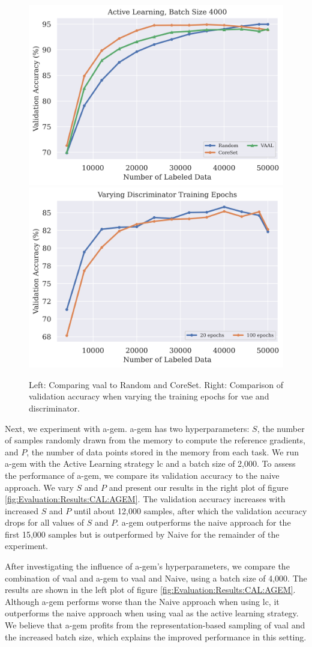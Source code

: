 \begin{figure}[h]
    \centering
    \includegraphics[width=0.46\linewidth]{images/results_CAL/vaal_al.png} \hfill
    \includegraphics[width=0.46\linewidth]{images/results_CAL/vaal_disc_epochs.png}
    \caption[Continual Active Learning Custom Replay strategy]{Left: Comparing \gls{vaal} to Random and CoreSet.
    Right: Comparison of validation accuracy when varying the training epochs for \gls{vae} and discriminator.}
    \label{fig:Evaluation:CAL:VAAL}
\end{figure}

Next, we experiment with \gls{a-gem}. \gls{a-gem} has two hyperparameters: $S$,  the number of samples randomly drawn from the memory to compute the reference
gradients, and $P$, the number of data points stored in the memory from each task. We run \gls{a-gem} with the Active Learning strategy \gls{lc} and a batch size
of 2,000. To assess the performance of \gls{a-gem}, we compare its validation accuracy to the naive approach. We vary $S$ and $P$ and present our results in the right plot
of figure \ref{fig:Evaluation:Results:CAL:AGEM}. The validation accuracy increases with increased $S$ and $P$ until about 12,000 samples, after which the validation 
accuracy drops for all values of $S$ and $P$. \gls{a-gem} outperforms the naive approach for the first 15,000 samples but is outperformed by Naive for the remainder of
the experiment. \par
After investigating the influence of \gls{a-gem}'s hyperparameters, we compare the combination of \gls{vaal} and \gls{a-gem} to \gls{vaal} and Naive, using a batch size
of 4,000. The results are shown in the left plot of figure \ref{fig:Evaluation:Results:CAL:AGEM}. Although \gls{a-gem} performs worse than the Naive
approach when using \gls{lc}, it outperforms the naive approach when using \gls{vaal} as the active learning strategy. We believe that \gls{a-gem} profits from the 
representation-based sampling of \gls{vaal} and the increased batch size, which explains the improved performance in this setting. \par

